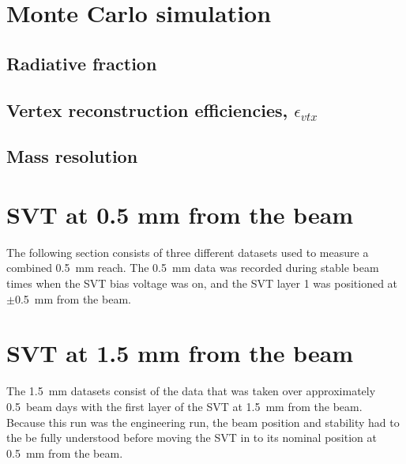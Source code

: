 \documentclass[12pt]{report}
\begin{document}
\section{Monte Carlo simulation}
\subsection{Radiative fraction}


\subsection{Vertex reconstruction efficiencies, $\epsilon_{vtx}$}
\subsection{Mass resolution}






\section{SVT at 0.5 mm from the beam}
The following section consists of three different datasets used to measure a combined 0.5~mm reach. The 0.5~mm data was recorded during stable beam times when the SVT bias voltage was on, and the SVT layer 1 was positioned at $\pm$0.5~mm from the beam. 

%
%
%

\section{SVT at 1.5 mm from the beam}

The 1.5~mm datasets consist of the data that was taken over approximately 0.5~beam days with the first layer of the SVT at 1.5~mm from the beam. Because this run was the engineering run, the beam position and stability had to the be fully understood before moving the SVT in to its nominal position at 0.5~mm from the beam.  

%
%
%
\end{document}
